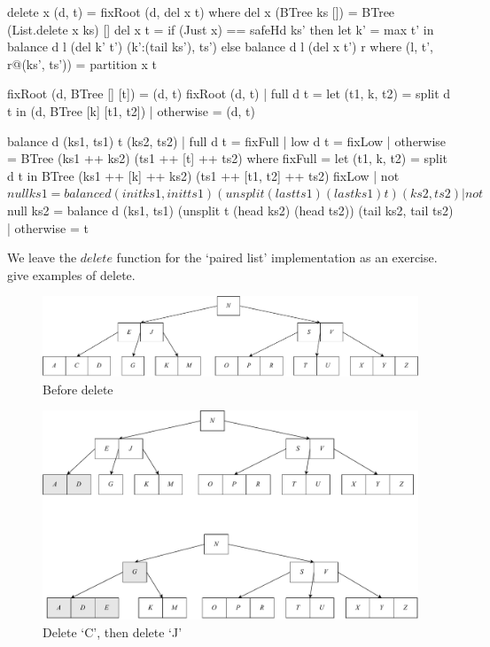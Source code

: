 \documentclass[b5paper]{article}
\begin{document}
\begin{Haskell}
delete x (d, t) = fixRoot (d, del x t) where
    del x (BTree ks []) = BTree (List.delete x ks) []
    del x t = if (Just x) == safeHd ks' then
                let k' = max t' in
                   balance d l (del k' t') (k':(tail ks'), ts')
              else balance d l (del x t') r
      where
        (l, t', r@(ks', ts')) = partition x t

fixRoot (d, BTree [] [t]) = (d, t)
fixRoot (d, t) | full d t  = let (t1, k, t2) = split d t in
                               (d, BTree [k] [t1, t2])
               | otherwise = (d, t)

balance d (ks1, ts1) t (ks2, ts2)
    | full d t  = fixFull
    | low  d t  = fixLow
    | otherwise = BTree (ks1 ++ ks2) (ts1 ++ [t] ++ ts2)
  where
    fixFull = let (t1, k, t2) = split d t in
                BTree (ks1 ++ [k] ++ ks2) (ts1 ++ [t1, t2] ++ ts2)
    fixLow | not $ null ks1 = balance d (init ks1, init ts1)
                                      (unsplit (last ts1) (last ks1) t)
                                      (ks2, ts2)
           | not $ null ks2 = balance d (ks1, ts1)
                                      (unsplit t (head ks2) (head ts2))
                                      (tail ks2, tail ts2)
           | otherwise = t
\end{Haskell}

We leave the $delete$ function for the `paired list' implementation as an exercise.  give examples of delete.

\begin{figure}[htbp]
  \centering
  \includegraphics[scale=0.5]{img/btree-del-before}
  \caption{Before delete}
  \label{fig:btree-del-before}
\end{figure}

\begin{figure}[htbp]
  \centering
  \includegraphics[scale=0.5]{img/btree-del-CJ}
  \caption{Delete `C', then delete `J'}
  \label{fig:btree-del-CJ}
\end{figure}
\end{document}
